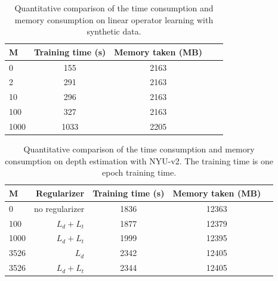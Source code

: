 \documentclass{article} %
\begin{document}
\begin{table}[h]
	\caption{Quantitative comparison of the time consumption and memory consumption on linear operator learning with synthetic data.}
	\label{tab:app_m}
	\centering
		\begin{tabular}{l|cccc}
			\hline
			\multirow{1}[0]{*}{M}
			& Training time (s) & Memory taken (MB)  \\
			\hline
			0 & 155 & 2163    \\
			2 & 291 & 2163    \\
			10 & 296 & 2163    \\
			100 & 327 & 2163   \\
			1000 & 1033 & 2205    \\			
			\hline
		\end{tabular}
\end{table}

\begin{table}[t]
	\caption{Quantitative comparison of the time consumption and memory consumption on depth estimation with NYU-v2. The training time is  one epoch training time.}
	\label{tab:app_m2}
	\centering
		\begin{tabular}{lr|ccc}
			\hline
			\multirow{1}[0]{*}{M}
			& Regularizer & Training time (s) & Memory taken (MB) \\
			\hline
			0 & no regularizer & 1836 & 12363   \\
			100 & $L_d+L_t$ & 1877 & 12379   \\
			1000 & $L_d+L_t$ & 1999 & 12395   \\
			3526  & $L_d$ & 2342 & 12405   \\
			3526 & $L_d+L_t$ & 2344 & 12405  \\
			\hline
		\end{tabular}
\end{table}
\end{document}
